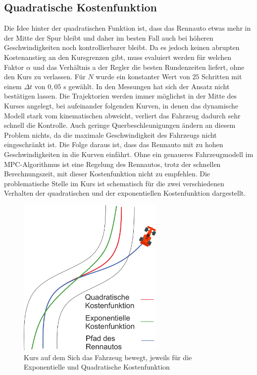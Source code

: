 \documentclass{like}
\begin{document}
\subsection{Quadratische Kostenfunktion}
Die Idee hinter der quadratischen Funktion ist, dass das Rennauto etwas mehr in der Mitte der Spur bleibt und daher im besten Fall auch bei höheren Geschwindigkeiten noch kontrollierbarer bleibt. Da es jedoch keinen abrupten Kostenanstieg an den Kursgrenzen gibt, muss evaluiert werden für welchen Faktor $\alpha$ und das Verhältnis a der Regler die besten Rundenzeiten liefert, ohne den Kurs zu verlassen. Für $N$ wurde ein konstanter Wert von $25$ Schritten mit einem $\Delta t$ von $0,05$ s gewählt. In den Messungen hat sich der Ansatz nicht bestätigen lassen. Die Trajektorien werden immer möglichst in der Mitte des Kurses angelegt, bei aufeinander folgenden Kurven, in denen das dynamische Modell stark vom kinematischen abweicht, verliert das Fahrzeug dadurch sehr schnell die Kontrolle. Auch geringe Querbeschleunigungen ändern an diesem Problem nichts, da die maximale Geschwindigkeit des Fahrzeugs nicht eingeschränkt ist. Die Folge daraus ist, dass das Rennauto mit zu hohen Geschwindigkeiten in die Kurven einfährt. Ohne ein genaueres Fahrzeugmodell im \ac{MPC}-Algorithmus ist eine Regelung des Rennautos, trotz der schnellen Berechnungszeit, mit dieser Kostenfunktion nicht zu empfehlen.
Die problematische Stelle im Kurs ist schematisch für die zwei verschiedenen Verhalten der quadratischen und der exponentiellen Kostenfunktion dargestellt. 

\begin{figure}[ht!]
	\centering
	\includegraphics[width=200pt]{Abbildungen/quadraticCostFunction.png}
	\caption{Kurs auf dem Sich das Fahrzeug bewegt, jeweils für die Exponentielle und Quadratische Kostenfunktion}
	\label{fig:quadraticCostFunct}
\end{figure}
\end{document}
